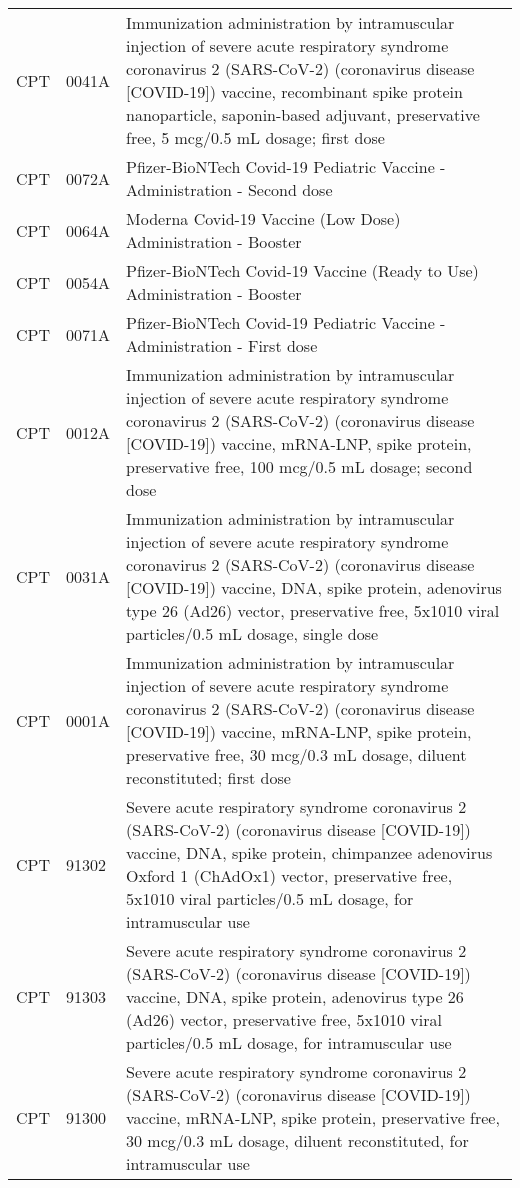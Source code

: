 \begin{longtable}{p{}p{}p{}}
  CPT & 0041A & Immunization administration by intramuscular injection of severe acute respiratory syndrome coronavirus 2 (SARS-CoV-2) (coronavirus disease [COVID-19]) vaccine, recombinant spike protein nanoparticle, saponin-based adjuvant, preservative free, 5 mcg/0.5 mL dosage; first dose \\ 
  CPT & 0072A & Pfizer-BioNTech Covid-19 Pediatric Vaccine - Administration - Second dose \\ 
  CPT & 0064A & Moderna Covid-19 Vaccine (Low Dose) Administration - Booster \\ 
  CPT & 0054A & Pfizer-BioNTech Covid-19 Vaccine (Ready to Use) Administration - Booster \\ 
  CPT & 0071A & Pfizer-BioNTech Covid-19 Pediatric Vaccine - Administration - First dose \\ 
  CPT & 0012A & Immunization administration by intramuscular injection of severe acute respiratory syndrome coronavirus 2 (SARS-CoV-2) (coronavirus disease [COVID-19]) vaccine, mRNA-LNP, spike protein, preservative free, 100 mcg/0.5 mL dosage; second dose \\ 
  CPT & 0031A & Immunization administration by intramuscular injection of severe acute respiratory syndrome coronavirus 2 (SARS-CoV-2) (coronavirus disease [COVID-19]) vaccine, DNA, spike protein, adenovirus type 26 (Ad26) vector, preservative free, 5x1010 viral particles/0.5 mL dosage, single dose \\ 
  CPT & 0001A & Immunization administration by intramuscular injection of severe acute respiratory syndrome coronavirus 2 (SARS-CoV-2) (coronavirus disease [COVID-19]) vaccine, mRNA-LNP, spike protein, preservative free, 30 mcg/0.3 mL dosage, diluent reconstituted; first dose \\ 
  CPT & 91302 & Severe acute respiratory syndrome coronavirus 2 (SARS-CoV-2) (coronavirus disease [COVID-19]) vaccine, DNA, spike protein, chimpanzee adenovirus Oxford 1 (ChAdOx1) vector, preservative free, 5x1010 viral particles/0.5 mL dosage, for intramuscular use \\ 
  CPT & 91303 & Severe acute respiratory syndrome coronavirus 2 (SARS-CoV-2) (coronavirus disease [COVID-19]) vaccine, DNA, spike protein, adenovirus type 26 (Ad26) vector, preservative free, 5x1010 viral particles/0.5 mL dosage, for intramuscular use \\ 
  CPT & 91300 & Severe acute respiratory syndrome coronavirus 2 (SARS-CoV-2) (coronavirus disease [COVID-19]) vaccine, mRNA-LNP, spike protein, preservative free, 30 mcg/0.3 mL dosage, diluent reconstituted, for intramuscular use \\ 

\end{longtable}
